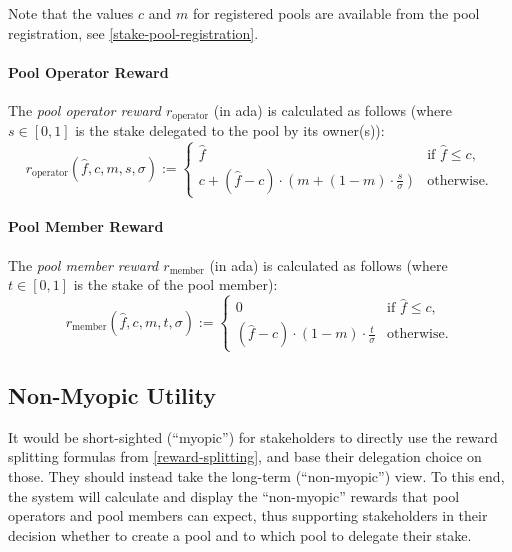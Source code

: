 \documentclass[11pt,a4paper,dvipsnames,twosided]{article}
\begin{document}
Note that the values \(c\) and \(m\) for registered pools are available
from the pool registration, see \cref{stake-pool-registration}.

\paragraph{Pool Operator Reward}

The \emph{pool operator reward \(r_\mathrm{operator}\)} (in ada) is calculated
as follows (where \(s\in[0,1]\) is the stake delegated to the pool by its
owner(s)):
\[ r_\mathrm{operator}(\hat{f}, c, m, s, \sigma) := \left\{
    \begin{array}{ll}
        \displaystyle\hat{f} &
        \text{if $\hat{f}\leq c$,} \\
        \displaystyle c + (\hat{f} - c)\cdot\left(m + (1-m)\cdot\frac{s}{\sigma}\right) &
        \text{otherwise.}
    \end{array}
    \right.
\]

\paragraph{Pool Member Reward}
\label{pool-member-reward}

The \emph{pool member reward \(r_\mathrm{member}\)} (in ada) is
calculated as follows (where \(t\in[0,1]\) is the stake of the pool
member): \[
    r_\mathrm{member}(\hat{f}, c, m, t, \sigma) :=
    \left\{
    \begin{array}{ll}
        \displaystyle 0 &
        \text{if $\hat{f}\leq c$,} \\
        \displaystyle (\hat{f} - c)\cdot(1-m)\cdot\frac{t}{\sigma} &
        \text{otherwise.}
    \end{array}
    \right.
\]

\subsection{Non-Myopic Utility}
\label{non-myopic-utility}

It would be short-sighted (``myopic'') for stakeholders to directly use the
reward splitting formulas from \cref{reward-splitting}, and base their
delegation choice on those. They should instead take the long-term
(``non-myopic'') view. To this end, the system will calculate and display the
``non-myopic'' rewards that pool operators and pool members can expect, thus
supporting stakeholders in their decision whether to create a pool and to which
pool to delegate their stake.
\end{document}
